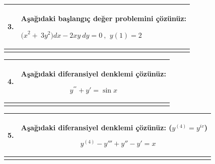 \documentclass[
]{article}
\newcounter{none} %
\begin{document}
{\def\LTcaptype{none} %
\begin{longtable}[]{@{}
  >{\raggedright\arraybackslash}p{}
  >{\raggedright\arraybackslash}p{}@{}}
\toprule\noalign{}
\begin{minipage}[b]{\linewidth}\centering
\textbf{3.}
\end{minipage} & \begin{minipage}[b]{\linewidth}\raggedright
Aşağıdaki başlangıç değer problemini çözünüz:

\({(x}^{2} + {\ 3y}^{2})dx - 2xy\ dy = 0\ ,\) \(y(1) = 2\)
\end{minipage} \\
\midrule\noalign{}
\endhead
\bottomrule\noalign{}
\endlastfoot
\end{longtable}
}

{\def\LTcaptype{none} %
\begin{longtable}[]{@{}
  >{\raggedright\arraybackslash}p{}
  >{\raggedright\arraybackslash}p{}@{}}
\toprule\noalign{}
\begin{minipage}[b]{\linewidth}\centering
\textbf{4.}
\end{minipage} & \begin{minipage}[b]{\linewidth}\raggedright
Aşağıdaki diferansiyel denklemi çözünüz:

\[y^{'''} + y' = \sin x\]
\end{minipage} \\
\midrule\noalign{}
\endhead
\bottomrule\noalign{}
\endlastfoot
\end{longtable}
}

{\def\LTcaptype{none} %
\begin{longtable}[]{@{}
  >{\raggedright\arraybackslash}p{}
  >{\raggedright\arraybackslash}p{}@{}}
\toprule\noalign{}
\begin{minipage}[b]{\linewidth}\centering
\textbf{5.}
\end{minipage} & \begin{minipage}[b]{\linewidth}\raggedright
Aşağıdaki diferansiyel denklemi çözünüz: (\(y^{(4)} = y^{iv}\))

\[\ \ \ \ \ y^{(4)} - y''' + y'' - y' = x\]
\end{minipage} \\
\midrule\noalign{}
\endhead
\bottomrule\noalign{}
\endlastfoot
\end{longtable}
}
\end{document}
